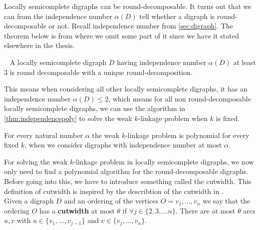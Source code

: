 Locally semicomplete digraphs can be round-decomposable. It turns out that we can from the independence number $\alpha (D)$ tell whether a digraph is round-decomposable or not.
Recall independence number from \autoref{sec:digraph}. 
The theorem below is from \cite{bangJGT77} where we omit some part of it since we have it stated elsewhere in the thesis.
\begin{thm}~\cite{bangJGT77}
    A locally semicomplete digraph $D$ having independence number $\alpha (D)$ at least 3 is round decomposable with a unique round-decomposition. 
    \label{thm:independenceround}
\end{thm} 
This means when considering all other locally semicomplete digraphs, it has an independence number $\alpha (D) \leq 2$, which means for all non round-decomposable locally semicomplete digraphs, we can use the algorithm in \autoref{thm:independencepoly} to solve the weak $k$-linkage problem when $k$ is fixed.
\begin{thm}
        For every natural number $\alpha$ the weak $k$-linkage problem is polynomial for every fixed $k$, when we consider digraphs with independence number at most $\alpha$.
    \label{thm:independencepoly} 
\end{thm}
For solving the weak $k$-linkage problem in locally semicomplete digraphs, we now only need to find a polynomial algorithm for the round-decomposable digraphs.
Before going into this, we have to introduce something called the cutwidth. This definition of cutwidth is inspired by the describtion of the cutwidth in \cite{bangJGT77}.\\
Given a digraph $D$ and an ordering of the vertices $O=v_1,\dots,v_n$ we say that the ordering $O$ has a \textbf{cutwidth} at most $\theta$ if $\forall j\in \lbrace 2,3, \dots n\rbrace$. There are at most $\theta$ arcs $u,v$ with $u\in \lbrace v_1,\dots ,v_{j-1}\rbrace$ and $v\in \lbrace v_j,\dots ,v_n\rbrace$.

